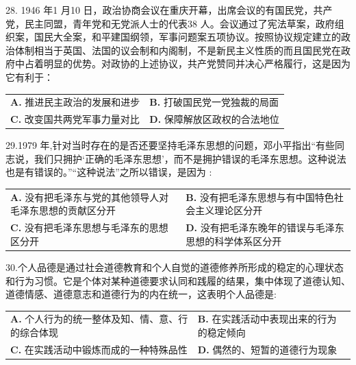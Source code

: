 \documentclass[UTF8,11pt]{ctexart}
\begin{document}
28. 1946 年1 月10 日，政治协商会议在重庆开幕，出席会议的有国民党，共产党，民主同盟，青年党和无党派人士的代表38 人。会议通过了宪法草案，政府组织案，国民大全案，和平建国纲领，军事问题案五项协议。按照协议规定建立的政治体制相当于英国、法国的议会制和内阁制，不是新民主义性质的而且国民党在政府中占着明显的优势。对政协的上述协议，共产党赞同并决心严格履行，这是因为它有利于：


\begin{center}\begin{tabular}{>{\raggedright\arraybackslash}p{\dimexpr(\linewidth-4\tabcolsep)/2\relax}>{\raggedright\arraybackslash}p{\dimexpr(\linewidth-4\tabcolsep)/2\relax}}
\textbf{A.} 推进民主政治的发展和进步 & \textbf{B.} 打破国民党一党独裁的局面\\[.35em]
\textbf{C.} 改变国共两党军事力量对比 & \textbf{D.} 保障解放区政权的合法地位\\[.35em]\end{tabular}\end{center}

29.1979 年,针对当时存在的是否还要坚持毛泽东思想的问题，邓小平指出“有些同志说，我们只拥护‘正确的毛泽东思想’，而不是拥护错误的毛泽东思想。这种说法也是有错误的。”“这种说法”之所以错误，是因为 :


\begin{center}\begin{tabular}{>{\raggedright\arraybackslash}p{\dimexpr(\linewidth-4\tabcolsep)/2\relax}>{\raggedright\arraybackslash}p{\dimexpr(\linewidth-4\tabcolsep)/2\relax}}
\textbf{A.} 没有把毛泽东与党的其他领导人对毛泽东思想的贡献区分开 & \textbf{B.} 没有把毛泽东思想与有中国特色社会主义理论区分开\\[.35em]
\textbf{C.} 没有把毛泽东思想与毛泽东的思想区分开 & \textbf{D.} 没有把毛泽东晚年的错误与毛泽东思想的科学体系区分开\\[.35em]\end{tabular}\end{center}

30.个人品德是通过社会道德教育和个人自觉的道德修养所形成的稳定的心理状态和行为习惯。它是个体对某种道德要求认同和践履的结果，集中体现了道德认知、道德情感、道德意志和道德行为的内在统一，这表明个人品德是:


\begin{center}\begin{tabular}{>{\raggedright\arraybackslash}p{\dimexpr(\linewidth-4\tabcolsep)/2\relax}>{\raggedright\arraybackslash}p{\dimexpr(\linewidth-4\tabcolsep)/2\relax}}
\textbf{A.} 个人行为的统一整体及知、情、意、行的综合体现 & \textbf{B.} 在实践活动中表现出来的行为的稳定倾向\\[.35em]
\textbf{C.} 在实践活动中锻炼而成的一种特殊品性 & \textbf{D.} 偶然的、短暂的道德行为现象\\[.35em]\end{tabular}\end{center}
\end{document}
